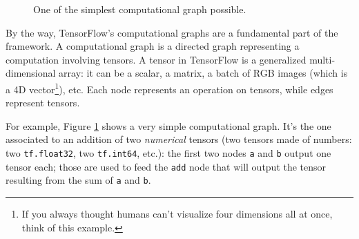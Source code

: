 \begin{figure}
  \centering
  \caption[]{One of the simplest computational graph possible.}
  \label{fig:easy-graph}
\end{figure}

By the way, TensorFlow's computational graphs are a fundamental part of
the framework. A computational graph is a directed graph representing a
computation involving tensors. A tensor in TensorFlow is a generalized
multi-dimensional array: it can be a scalar, a matrix, a batch of RGB
images (which is a 4D vector\footnote{If you always thought humans
  can't visualize four dimensions all at once, think of this
  example.}), etc. Each node represents an operation on tensors, while
edges represent tensors.

For example, Figure \ref{fig:easy-graph} shows a very simple
computational graph. It's the one associated to an addition of two
\emph{numerical} tensors (two tensors made of numbers: two
\texttt{tf.float32}, two \texttt{tf.int64}, etc.): the first two nodes
\texttt{a} and \texttt{b} output one tensor each; those are used to
feed the \texttt{add} node that will output the tensor resulting from
the sum of \texttt{a} and \texttt{b}.

